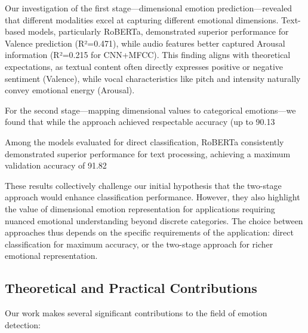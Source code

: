 \documentclass[12pt]{article}
\begin{document}
Our investigation of the first stage—dimensional emotion prediction—revealed that different modalities excel at capturing different emotional dimensions. Text-based models, particularly RoBERTa, demonstrated superior performance for Valence prediction (R²=0.471), while audio features better captured Arousal information (R²=0.215 for CNN+MFCC). This finding aligns with theoretical expectations, as textual content often directly expresses positive or negative sentiment (Valence), while vocal characteristics like pitch and intensity naturally convey emotional energy (Arousal).

For the second stage—mapping dimensional values to categorical emotions—we found that while the approach achieved respectable accuracy (up to 90.13%

Among the models evaluated for direct classification, RoBERTa consistently demonstrated superior performance for text processing, achieving a maximum validation accuracy of 91.82%

These results collectively challenge our initial hypothesis that the two-stage approach would enhance classification performance. However, they also highlight the value of dimensional emotion representation for applications requiring nuanced emotional understanding beyond discrete categories. The choice between approaches thus depends on the specific requirements of the application: direct classification for maximum accuracy, or the two-stage approach for richer emotional representation.

\subsection{Theoretical and Practical Contributions}
Our work makes several significant contributions to the field of emotion detection:
\end{document}
